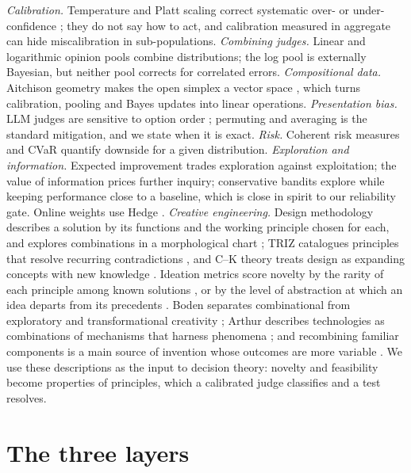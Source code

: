 \documentclass[11pt]{article}
\theoremstyle{definition}
\begin{document}
\emph{Calibration.} Temperature and Platt scaling correct systematic over- or under-confidence
\cite{platt1999,guo2017}; they do not say how to act, and calibration measured in aggregate can hide
miscalibration in sub-populations. \emph{Combining judges.} Linear and logarithmic opinion pools
\cite{genest1986} combine distributions; the log pool is externally Bayesian, but neither pool
corrects for correlated errors. \emph{Compositional data.} Aitchison geometry makes the open
simplex a vector space \cite{aitchison1986}, which turns calibration, pooling and Bayes updates into
linear operations. \emph{Presentation bias.} LLM judges are sensitive to option order
\cite{zheng2024}; permuting and averaging is the standard mitigation, and we state when it is exact.
\emph{Risk.} Coherent risk measures \cite{artzner1999} and CVaR \cite{rockafellar2000} quantify
downside for a given distribution. \emph{Exploration and information.} Expected improvement
\cite{jones1998} trades exploration against exploitation; the value of information
\cite{howard1966} prices further inquiry; conservative bandits \cite{wu2016} explore while keeping
performance close to a baseline, which is close in spirit to our reliability gate. Online weights
use Hedge \cite{freund1997}.
\emph{Creative engineering.} Design methodology describes a solution by its functions and the
working principle chosen for each, and explores combinations in a morphological chart
\cite{zwicky1969,pahl2007}; TRIZ catalogues principles that resolve recurring contradictions
\cite{altshuller1984}, and C--K theory treats design as expanding concepts with new knowledge
\cite{hatchuel2009}. Ideation metrics score novelty by the rarity of each principle among known
solutions \cite{shah2003}, or by the level of abstraction at which an idea departs from its
precedents \cite{sarkar2011}. Boden separates combinational from exploratory and transformational
creativity \cite{boden2004}; Arthur describes technologies as combinations of mechanisms that
harness phenomena \cite{arthur2009}; and recombining familiar components is a main source of
invention whose outcomes are more variable \cite{fleming2001}. We use these descriptions as the
input to decision theory: novelty and feasibility become properties of principles, which a
calibrated judge classifies and a test resolves.

\section{The three layers}\label{sec:layers}
\end{document}
